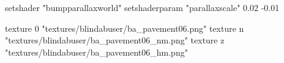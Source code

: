 	setshader "bumpparallaxworld"
	setshaderparam "parallaxscale" 0.02 -0.01

		texture 0 "textures/blindabuser/ba_pavement06.png"
		texture n "textures/blindabuser/ba_pavement06_nm.png"
		texture z "textures/blindabuser/ba_pavement06_hm.png"
